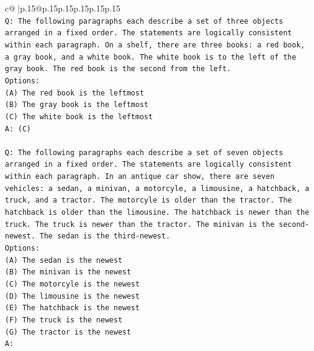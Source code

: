 \documentclass{article}
\begin{document}
{\begin{supertabular}{c@{$\;$}|p{.15\linewidth}@{}p{.15\linewidth}p{.15\linewidth}p{.15\linewidth}p{.15\linewidth}p{.15\linewidth}}
{{{\\ 
\texttt{Q: The following paragraphs each describe a set of three objects arranged in a fixed order. The statements are logically consistent within each paragraph. On a shelf, there are three books: a red book, a gray book, and a white book. The white book is to the left of the gray book. The red book is the second from the left.} \\
\texttt{Options:} \\
\texttt{(A) The red book is the leftmost} \\
\texttt{(B) The gray book is the leftmost} \\
\texttt{(C) The white book is the leftmost} \\
\texttt{A: (C)} \\
\\ 
\texttt{Q: The following paragraphs each describe a set of seven objects arranged in a fixed order. The statements are logically consistent within each paragraph. In an antique car show, there are seven vehicles: a sedan, a minivan, a motorcyle, a limousine, a hatchback, a truck, and a tractor. The motorcyle is older than the tractor. The hatchback is older than the limousine. The hatchback is newer than the truck. The truck is newer than the tractor. The minivan is the second{-}newest. The sedan is the third{-}newest.} \\
\texttt{Options:} \\
\texttt{(A) The sedan is the newest} \\
\texttt{(B) The minivan is the newest} \\
\texttt{(C) The motorcyle is the newest} \\
\texttt{(D) The limousine is the newest} \\
\texttt{(E) The hatchback is the newest} \\
\texttt{(F) The truck is the newest} \\
\texttt{(G) The tractor is the newest} \\
\texttt{A:} \\
            }
        }
    }
     \\ \\


\end{supertabular}}
\end{document}
